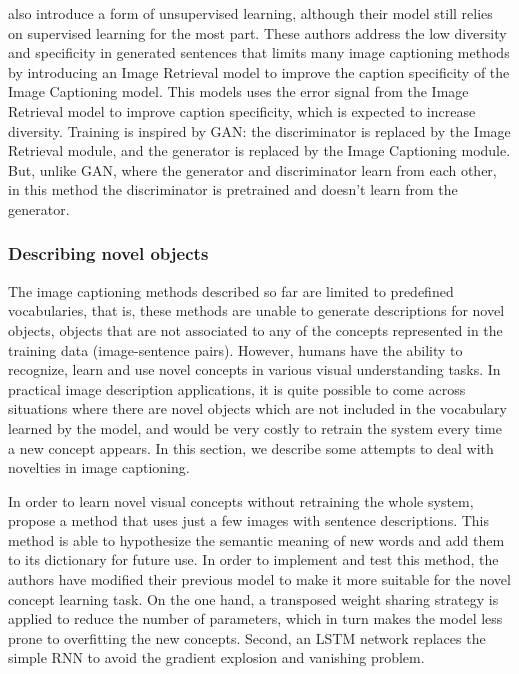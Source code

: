 \citet{Lindh2018} also introduce a form of unsupervised learning, although their model still relies on supervised learning for the most part. These authors address the low diversity and specificity in generated sentences that limits many image captioning methods by  introducing an Image Retrieval model to improve the caption specificity of the Image Captioning model. This models uses the error signal from the Image Retrieval model to improve caption specificity, which is expected to increase diversity. Training is inspired by GAN: the discriminator is replaced by the Image Retrieval module, and the generator is replaced by the Image Captioning module. But, unlike GAN, where the generator and discriminator learn from each other, in this method the discriminator is pretrained and doesn't learn from the generator. 

\subsubsection{Describing novel objects}\label{sec:novel_objects}

The image captioning methods described so far are limited to predefined vocabularies, that is, these methods are unable to generate descriptions for novel objects, objects that are not associated to any of the concepts represented in the training data (image-sentence pairs). However, humans have the ability to recognize, learn and use novel concepts in various visual understanding tasks. In practical image description applications, it is quite possible to come across situations where there are novel objects which are not included in the vocabulary learned by the model, and would be very costly to retrain the system every time a new concept appears. In this section, we describe some attempts to deal with novelties in image captioning. 

In order to learn novel visual concepts without retraining the whole system, \citet{Mao2015_Child} propose a method that uses just a few images with sentence descriptions. This method is able to hypothesize the semantic meaning of new words and add them to its dictionary for future use. In order to implement and test this method, the authors have modified their previous model \citep{Mao2015_mRNN} to make it more suitable for the novel concept learning task. On the one hand, a transposed weight sharing strategy is applied to reduce the number of parameters, which in turn makes the model less prone to overfitting the new concepts. Second, an LSTM network replaces the simple RNN to avoid the gradient explosion and vanishing problem. 

